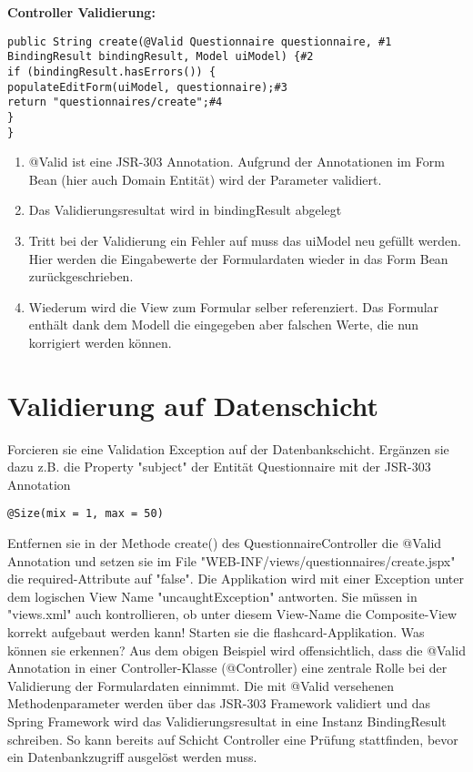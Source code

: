 \documentclass[a4paper,10pt]{scrreprt}
\begin{document}
{\textbf{Controller Validierung:}
\begin{lstlisting}[caption=Controller Validierung Spring]
 public String create(@Valid Questionnaire questionnaire, #1
BindingResult bindingResult, Model uiModel) {#2
if (bindingResult.hasErrors()) {
populateEditForm(uiModel, questionnaire);#3
return "questionnaires/create";#4
}
}
\end{lstlisting}
\begin{enumerate}
 \item @Valid ist eine JSR-303 Annotation. Aufgrund der Annotationen im Form Bean (hier auch
Domain Entität) wird der Parameter validiert.
\item Das Validierungsresultat wird in bindingResult abgelegt
\item Tritt bei der Validierung ein Fehler auf muss das uiModel neu gefüllt werden. Hier werden die
Eingabewerte der Formulardaten wieder in das Form Bean zurückgeschrieben.
\item Wiederum wird die View zum Formular selber referenziert. Das Formular enthält dank dem
Modell die eingegeben aber falschen Werte, die nun korrigiert werden können.

\end{enumerate}

\section{Validierung auf Datenschicht}
Forcieren sie eine Validation Exception auf der Datenbankschicht. Ergänzen sie dazu z.B. die
Property "subject" der Entität Questionnaire mit der JSR-303 Annotation
\begin{verbatim}
@Size(mix = 1, max = 50)
\end{verbatim}
Entfernen sie in der Methode create() des QuestionnaireController die @Valid Annotation
und setzen sie im File "WEB-INF/views/questionnaires/create.jspx" die required-Attribute auf "false".
Die Applikation wird mit einer Exception unter dem logischen View Name "uncaughtException"
antworten. Sie müssen in "views.xml" auch kontrollieren, ob unter diesem View-Name die
Composite-View korrekt aufgebaut werden kann!
Starten sie die flashcard-Applikation. Was können sie erkennen?
Aus dem obigen Beispiel wird offensichtlich, dass die @Valid Annotation in einer Controller-Klasse
(@Controller) eine zentrale Rolle bei der Validierung der Formulardaten einnimmt. Die mit @Valid
versehenen Methodenparameter werden über das JSR-303 Framework validiert und das Spring
Framework wird das Validierungsresultat in eine Instanz BindingResult schreiben. So kann
bereits auf Schicht Controller eine Prüfung stattfinden, bevor ein Datenbankzugriff ausgelöst werden
muss.

}
\end{document}
